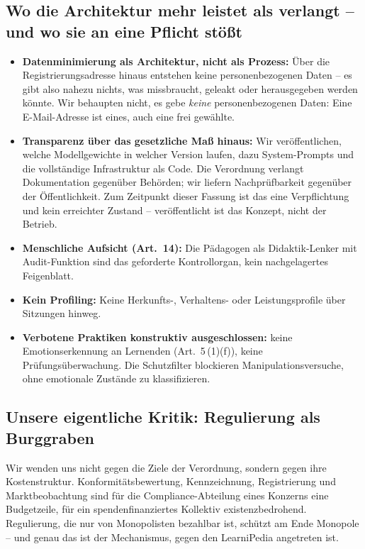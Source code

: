 \documentclass[11pt,a4paper]{article}
\begin{document}
\subsection{Wo die Architektur mehr leistet als verlangt -- und wo sie an eine Pflicht stößt}
\begin{itemize}[label=--]
    \item \textbf{Datenminimierung als Architektur, nicht als Prozess:} Über die Registrierungsadresse hinaus entstehen keine personenbezogenen Daten -- es gibt also nahezu nichts, was missbraucht, geleakt oder herausgegeben werden könnte. Wir behaupten nicht, es gebe \textit{keine} personenbezogenen Daten: Eine E-Mail-Adresse ist eines, auch eine frei gewählte.
    \item \textbf{Transparenz über das gesetzliche Maß hinaus:} Wir veröffentlichen, welche Modellgewichte in welcher Version laufen, dazu System-Prompts und die vollständige Infrastruktur als Code. Die Verordnung verlangt Dokumentation gegenüber Behörden; wir liefern Nachprüfbarkeit gegenüber der Öffentlichkeit. Zum Zeitpunkt dieser Fassung ist das eine Verpflichtung und kein erreichter Zustand -- veröffentlicht ist das Konzept, nicht der Betrieb.
    \item \textbf{Menschliche Aufsicht (Art.~14):} Die Pädagogen als Didaktik-Lenker mit Audit-Funktion sind das geforderte Kontrollorgan, kein nachgelagertes Feigenblatt.
    \item \textbf{Kein Profiling:} Keine Herkunfts-, Verhaltens- oder Leistungsprofile über Sitzungen hinweg.
    \item \textbf{Verbotene Praktiken konstruktiv ausgeschlossen:} keine Emotionserkennung an Lernenden (Art.~5\,(1)(f)), keine Prüfungsüberwachung. Die Schutzfilter blockieren Manipulationsversuche, ohne emotionale Zustände zu klassifizieren.
\end{itemize}

\subsection{Unsere eigentliche Kritik: Regulierung als Burggraben}
Wir wenden uns nicht gegen die Ziele der Verordnung, sondern gegen ihre Kostenstruktur. Konformitätsbewertung, Kennzeichnung, Registrierung und Marktbeobachtung sind für die Compliance-Abteilung eines Konzerns eine Budgetzeile, für ein spendenfinanziertes Kollektiv existenzbedrohend. Regulierung, die nur von Monopolisten bezahlbar ist, schützt am Ende Monopole -- und genau das ist der Mechanismus, gegen den LearniPedia angetreten ist.
\end{document}
